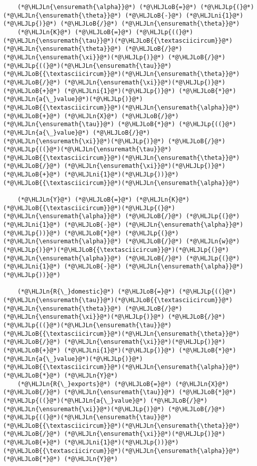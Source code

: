 \documentclass[12pt,a4paper]{article}
\newcommand{\HLJLn}[1]{#1}
\newcommand{\HLJLni}[1]{\textcolor[RGB]{59,151,46}{#1}}
\newcommand{\HLJLoB}[1]{\textcolor[RGB]{102,102,102}{\textbf{#1}}}
\newcommand{\HLJLp}[1]{#1}
\begin{document}
\begin{lstlisting}
    (*@\HLJLn{\ensuremath{\alpha}}@*) (*@\HLJLoB{=}@*) (*@\HLJLp{(}@*)(*@\HLJLn{\ensuremath{\theta}}@*) (*@\HLJLoB{-}@*) (*@\HLJLni{1}@*)(*@\HLJLp{)}@*) (*@\HLJLoB{/}@*) (*@\HLJLn{\ensuremath{\theta}}@*)
    (*@\HLJLn{K}@*) (*@\HLJLoB{=}@*) (*@\HLJLp{((}@*)(*@\HLJLn{\ensuremath{\tau}}@*)(*@\HLJLoB{{\textasciicircum}}@*)(*@\HLJLn{\ensuremath{\theta}}@*) (*@\HLJLoB{/}@*) (*@\HLJLn{\ensuremath{\xi}}@*)(*@\HLJLp{)}@*) (*@\HLJLoB{/}@*) (*@\HLJLp{((}@*)(*@\HLJLn{\ensuremath{\tau}}@*)(*@\HLJLoB{{\textasciicircum}}@*)(*@\HLJLn{\ensuremath{\theta}}@*) (*@\HLJLoB{/}@*) (*@\HLJLn{\ensuremath{\xi}}@*)(*@\HLJLp{)}@*) (*@\HLJLoB{+}@*) (*@\HLJLni{1}@*)(*@\HLJLp{)}@*) (*@\HLJLoB{*}@*) (*@\HLJLn{a{\_}value}@*)(*@\HLJLp{)}@*)(*@\HLJLoB{{\textasciicircum}}@*)(*@\HLJLn{\ensuremath{\alpha}}@*) (*@\HLJLoB{+}@*) (*@\HLJLn{X}@*) (*@\HLJLoB{/}@*) (*@\HLJLn{\ensuremath{\tau}}@*) (*@\HLJLoB{*}@*) (*@\HLJLp{((}@*)(*@\HLJLn{a{\_}value}@*) (*@\HLJLoB{/}@*) (*@\HLJLn{\ensuremath{\xi}}@*)(*@\HLJLp{)}@*) (*@\HLJLoB{/}@*) (*@\HLJLp{((}@*)(*@\HLJLn{\ensuremath{\tau}}@*)(*@\HLJLoB{{\textasciicircum}}@*)(*@\HLJLn{\ensuremath{\theta}}@*) (*@\HLJLoB{/}@*) (*@\HLJLn{\ensuremath{\xi}}@*)(*@\HLJLp{)}@*) (*@\HLJLoB{+}@*) (*@\HLJLni{1}@*)(*@\HLJLp{))}@*)(*@\HLJLoB{{\textasciicircum}}@*)(*@\HLJLn{\ensuremath{\alpha}}@*)

    (*@\HLJLn{Y}@*) (*@\HLJLoB{=}@*) (*@\HLJLn{K}@*)(*@\HLJLoB{{\textasciicircum}}@*)(*@\HLJLp{(}@*)(*@\HLJLn{\ensuremath{\alpha}}@*) (*@\HLJLoB{/}@*) (*@\HLJLp{(}@*)(*@\HLJLni{1}@*) (*@\HLJLoB{-}@*) (*@\HLJLn{\ensuremath{\alpha}}@*)(*@\HLJLp{))}@*) (*@\HLJLoB{*}@*) (*@\HLJLp{(}@*)(*@\HLJLn{\ensuremath{\alpha}}@*) (*@\HLJLoB{/}@*) (*@\HLJLn{w}@*)(*@\HLJLp{)}@*)(*@\HLJLoB{{\textasciicircum}}@*)(*@\HLJLp{(}@*)(*@\HLJLn{\ensuremath{\alpha}}@*) (*@\HLJLoB{/}@*) (*@\HLJLp{(}@*)(*@\HLJLni{1}@*) (*@\HLJLoB{-}@*) (*@\HLJLn{\ensuremath{\alpha}}@*)(*@\HLJLp{))}@*)

    (*@\HLJLn{R{\_}domestic}@*) (*@\HLJLoB{=}@*) (*@\HLJLp{((}@*)(*@\HLJLn{\ensuremath{\tau}}@*)(*@\HLJLoB{{\textasciicircum}}@*)(*@\HLJLn{\ensuremath{\theta}}@*) (*@\HLJLoB{/}@*) (*@\HLJLn{\ensuremath{\xi}}@*)(*@\HLJLp{)}@*) (*@\HLJLoB{/}@*) (*@\HLJLp{((}@*)(*@\HLJLn{\ensuremath{\tau}}@*)(*@\HLJLoB{{\textasciicircum}}@*)(*@\HLJLn{\ensuremath{\theta}}@*) (*@\HLJLoB{/}@*) (*@\HLJLn{\ensuremath{\xi}}@*)(*@\HLJLp{)}@*) (*@\HLJLoB{+}@*) (*@\HLJLni{1}@*)(*@\HLJLp{)}@*) (*@\HLJLoB{*}@*) (*@\HLJLn{a{\_}value}@*)(*@\HLJLp{)}@*)(*@\HLJLoB{{\textasciicircum}}@*)(*@\HLJLn{\ensuremath{\alpha}}@*) (*@\HLJLoB{*}@*) (*@\HLJLn{Y}@*)
    (*@\HLJLn{R{\_}exports}@*) (*@\HLJLoB{=}@*) (*@\HLJLn{X}@*) (*@\HLJLoB{/}@*) (*@\HLJLn{\ensuremath{\tau}}@*) (*@\HLJLoB{*}@*) (*@\HLJLp{((}@*)(*@\HLJLn{a{\_}value}@*) (*@\HLJLoB{/}@*) (*@\HLJLn{\ensuremath{\xi}}@*)(*@\HLJLp{)}@*) (*@\HLJLoB{/}@*) (*@\HLJLp{((}@*)(*@\HLJLn{\ensuremath{\tau}}@*)(*@\HLJLoB{{\textasciicircum}}@*)(*@\HLJLn{\ensuremath{\theta}}@*) (*@\HLJLoB{/}@*) (*@\HLJLn{\ensuremath{\xi}}@*)(*@\HLJLp{)}@*) (*@\HLJLoB{+}@*) (*@\HLJLni{1}@*)(*@\HLJLp{))}@*)(*@\HLJLoB{{\textasciicircum}}@*)(*@\HLJLn{\ensuremath{\alpha}}@*) (*@\HLJLoB{*}@*) (*@\HLJLn{Y}@*)


\end{lstlisting}
\end{document}
